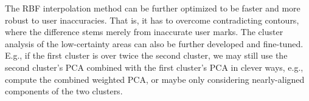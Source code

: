 The RBF interpolation method can be further optimized to be faster and more robust to user inaccuracies. That is, it has to overcome contradicting contours, where the difference stems merely from inaccurate user marks.
The cluster analysis of the low-certainty areas can also be further developed and fine-tuned. E.g., if the first cluster is over twice the second cluster, we may still use the second cluster's PCA combined with the first cluster's PCA in clever ways, e.g., compute the combined weighted PCA, or maybe only considering nearly-aligned components of the two clusters.
